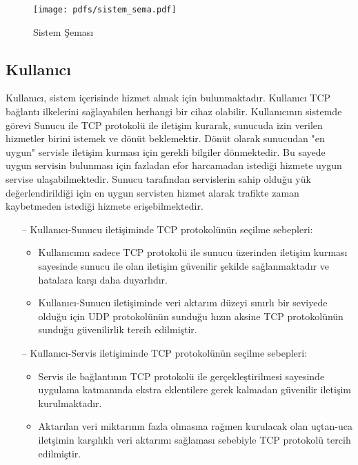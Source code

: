 \documentclass[12pt]{article}
\begin{document}
\begin{justify}
\begin{figure}[H]
    \centering
    \texttt{[image: pdfs/sistem\_sema.pdf]}
    \caption{Sistem Şeması}
    \label{fig:system_diagram}
\end{figure}

\subsection{Kullanıcı}
Kullanıcı, sistem içerisinde hizmet almak için bulunmaktadır. Kullanıcı TCP bağlantı ilkelerini sağlayabilen herhangi bir cihaz olabilir. Kullanıcının sistemde görevi Sunucu ile TCP protokolü ile iletişim kurarak, sunucuda izin verilen hizmetler birini istemek ve dönüt beklemektir. Dönüt olarak sunucudan "en uygun" servisle iletişim kurması için gerekli bilgiler dönmektedir. Bu sayede uygun servisin bulunması için fazladan efor harcamadan istediği hizmete uygun servise ulaşabilmektedir. Sunucu tarafından servislerin sahip olduğu yük değerlendirildiği için en uygun servisten hizmet alarak trafikte zaman kaybetmeden istediği hizmete erişebilmektedir.

\begin{enumerate}
    \item[--]Kullanıcı-Sunucu iletişiminde TCP protokolünün seçilme sebepleri:
    \begin{itemize}
        \item Kullanıcının sadece TCP protokolü ile sunucu üzerinden iletişim kurması sayesinde sunucu ile olan iletişim güvenilir şekilde sağlanmaktadır ve hatalara karşı daha duyarlıdır.
        \item Kullanıcı-Sunucu iletişiminde veri aktarım düzeyi sınırlı bir seviyede olduğu için UDP protokolünün sunduğu hızın aksine TCP protokolünün sunduğu güvenilirlik tercih edilmiştir.
    \end{itemize}
    \item[--] Kullanıcı-Servis iletişiminde TCP protokolünün seçilme sebepleri:
    \begin{itemize}
        \item Servis ile bağlantının TCP protokolü ile gerçekleştirilmesi sayesinde uygulama katmanında ekstra eklentilere gerek kalmadan güvenilir iletişim kurulmaktadır. 
        \item Aktarılan veri miktarının fazla olmasına rağmen kurulacak olan uçtan-uca iletşimin karşılıklı veri aktarımı sağlaması sebebiyle TCP protokolü tercih edilmiştir.
    \end{itemize}
\end{enumerate}


\end{justify}
\end{document}
